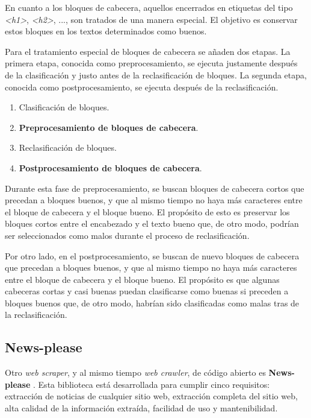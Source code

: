 En cuanto a los bloques de cabecera, aquellos encerrados en etiquetas del tipo \emph{<h1>}, \emph{<h2>}, 
..., son tratados de una manera especial. El objetivo es conservar estos bloques en los textos determinados 
como buenos.

Para el tratamiento especial de bloques de cabecera se añaden dos etapas. La primera etapa, conocida como 
preprocesamiento, se ejecuta justamente después de la clasificación y justo antes de la reclasificación de 
bloques. La segunda etapa, conocida como postprocesamiento, se ejecuta después de la reclasificación.

\begin{enumerate}
  \item Clasificación de bloques.
  \item \textbf{Preprocesamiento de bloques de cabecera}.
  \item Reclasificación de bloques.
  \item \textbf{Postprocesamiento de bloques de cabecera}.
\end{enumerate}

Durante esta fase de preprocesamiento, se buscan bloques de cabecera cortos que precedan a bloques buenos, 
y que al mismo tiempo no haya más caracteres entre el bloque de cabecera y el bloque bueno. El propósito 
de esto es preservar los bloques cortos entre el encabezado y el texto bueno que, de otro modo, podrían 
ser seleccionados como malos durante el proceso de reclasificación.

Por otro lado, en el postprocesamiento, se buscan de nuevo bloques de cabecera que precedan a bloques
buenos, y que al mismo tiempo no haya más caracteres entre el bloque de cabecera y el bloque bueno. El
propósito es que algunas cabeceras cortas y casi buenas puedan clasificarse como buenas si preceden a
bloques buenos que, de otro modo, habrían sido clasificadas como malas tras de la reclasificación.

\subsection{News-please}
\label{subsec:news-please}

Otro \emph{web scraper}, y al mismo tiempo \emph{web crawler}, de código abierto es \textbf{News-please}
\cite{news-please}. Esta biblioteca está desarrollada para cumplir cinco requisitos: extracción de
noticias de cualquier sitio web, extracción completa del sitio web, alta calidad de la información
extraída, facilidad de uso y mantenibilidad.

